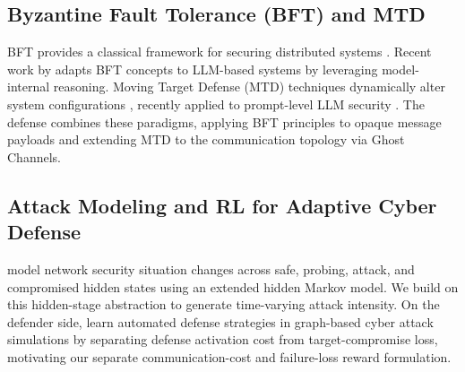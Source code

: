 \documentclass{article}
\begin{document}
\subsection{Byzantine Fault Tolerance ({BFT}) and {MTD}}
{BFT} provides a classical framework for securing distributed systems \citep{lamport1982byzantine}. Recent work by \citet{zheng2025bft} adapts {BFT} concepts to {LLM}-based systems by leveraging model-internal reasoning. Moving Target Defense ({MTD}) techniques dynamically alter system configurations \citep{skowyra2020mtd}, recently applied to prompt-level {LLM} security \citep{jailbreaker2024}. The defense combines these paradigms, applying {BFT} principles to opaque message payloads and extending {MTD} to the communication topology via Ghost Channels.

\subsection{Attack Modeling and {RL} for Adaptive Cyber Defense}
\citet{liao2020network} model network security situation changes across safe, probing, attack, and compromised hidden states using an extended hidden Markov model. We build on this hidden-stage abstraction to generate time-varying attack intensity. On the defender side, \citet{nyberg2023learning} learn automated defense strategies in graph-based cyber attack simulations by separating defense activation cost from target-compromise loss, motivating our separate communication-cost and failure-loss reward formulation.
\end{document}
